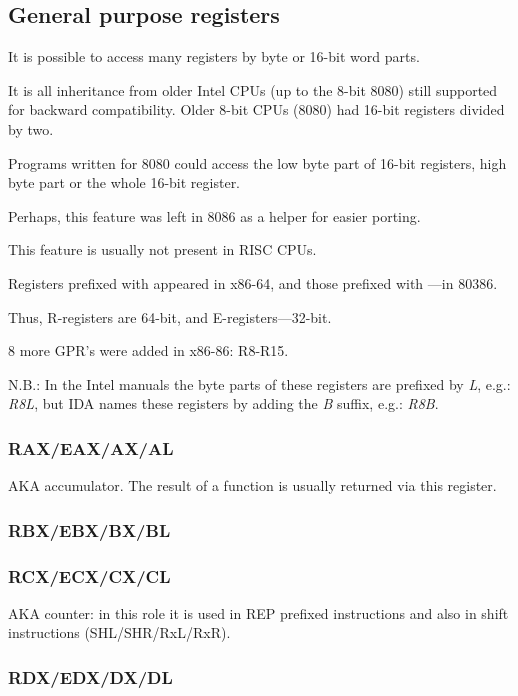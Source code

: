 \subsection{General purpose registers}

It is possible to access many registers by byte or 16-bit word parts.

It is all inheritance from older Intel CPUs (up to the 8-bit 8080) 
still supported for backward compatibility.
Older 8-bit CPUs (8080) had 16-bit registers divided by two.

Programs written for 8080 could access the low byte part of 16-bit registers, high byte part
or the whole 16-bit register.

Perhaps, this feature was left in 8086 as a helper for easier porting.

This feature is usually not present in \ac{RISC} CPUs.

Registers prefixed with  appeared in x86-64, and those prefixed with ---in 80386.

Thus, R-registers are 64-bit, and E-registers---32-bit.

8 more \ac{GPR}'s were added in x86-86: R8-R15.

N.B.: 
In the Intel manuals the byte parts of these registers are prefixed by \emph{L}, e.g.: \emph{R8L}, but \ac{IDA}
names these registers by adding the \emph{B} suffix, e.g.: \emph{R8B}.

\subsubsection{RAX/EAX/AX/AL}

\ac{AKA} accumulator.
The result of a function is usually returned via this register.

\subsubsection{RBX/EBX/BX/BL}

\subsubsection{RCX/ECX/CX/CL}

\ac{AKA} counter:
in this role it is used in REP prefixed instructions and also in shift instructions
(SHL/SHR/RxL/RxR).

\subsubsection{RDX/EDX/DX/DL}

